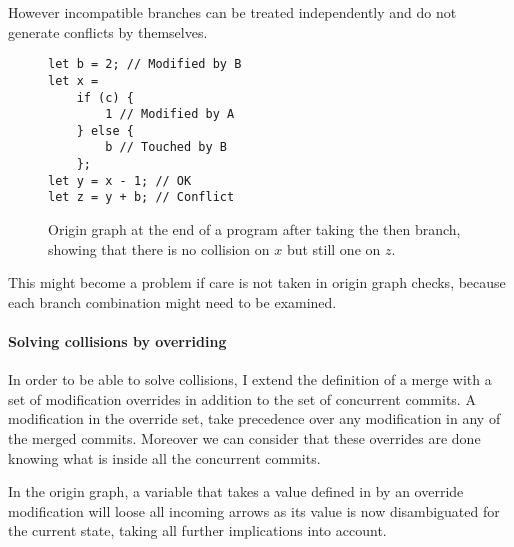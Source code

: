 \documentclass[a4paper,10pt]{article}
\begin{document}
However incompatible branches can be treated independently and do not generate conflicts by themselves.

\begin{figure}[ht]
\begin{minipage}{.5\textwidth}
\begin{lstlisting}
let b = 2; // Modified by B
let x =
    if (c) {
        1 // Modified by A
    } else {
        b // Touched by B
    };
let y = x - 1; // OK
let z = y + b; // Conflict
\end{lstlisting}
\end{minipage}\hfill
\begin{minipage}{.45\textwidth}
\centering{}
\end{minipage}
\caption{Origin graph at the end of a program after taking the then branch, showing that there is no collision on $x$ but still one on $z$.}
\label{fig:origin_graph_branches}
\end{figure}

This might become a problem if care is not taken in origin graph checks, because each branch combination might need to be examined.

\paragraph{Solving collisions by overriding}
In order to be able to solve collisions, I extend the definition of a merge with a set of modification overrides in addition to the set of concurrent commits.
A modification in the override set, take precedence over any modification in any of the merged commits. Moreover we can consider that these overrides are done knowing what is inside all the concurrent commits.

In the origin graph, a variable that takes a value defined in by an override modification will loose all incoming arrows as its value is now disambiguated for the current state, taking all further implications into account.
\end{document}
